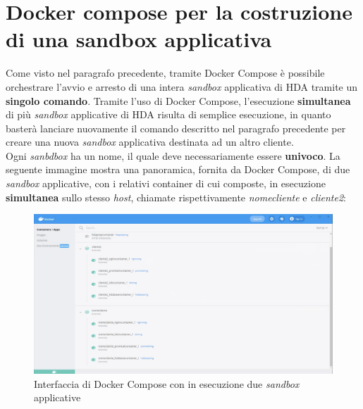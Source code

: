

\section{Docker compose per la costruzione di una sandbox applicativa}
Come visto nel paragrafo precedente, tramite Docker Compose è possibile orchestrare l'avvio e arresto di una intera \textit{sandbox} applicativa di HDA tramite un \textbf{singolo comando}. Tramite l'uso di Docker Compose, l'esecuzione \textbf{simultanea} di più \textit{sandbox} applicative di HDA risulta di semplice esecuzione, in quanto basterà lanciare nuovamente il comando descritto nel paragrafo precedente per creare una nuova \textit{sandbox} applicativa destinata ad un altro cliente. \\
Ogni \textit{sanbdbox} ha un nome, il quale deve necessariamente essere \textbf{univoco}.
La seguente immagine mostra una panoramica, fornita da Docker Compose, di due \textit{sandbox} applicative, con i relativi container di cui composte, in esecuzione \textbf{simultanea} sullo stesso \textit{host}, chiamate rispettivamente \textit{nomecliente} e \textit{cliente2}:
\begin{figure}[!h]     
\centering 
    \includegraphics[width=1.0\columnwidth]{immagini/screenshot/docker_compose_sandbox} 
    \caption{Interfaccia di Docker Compose con in esecuzione due \textit{sandbox} applicative}
\end{figure} \\


